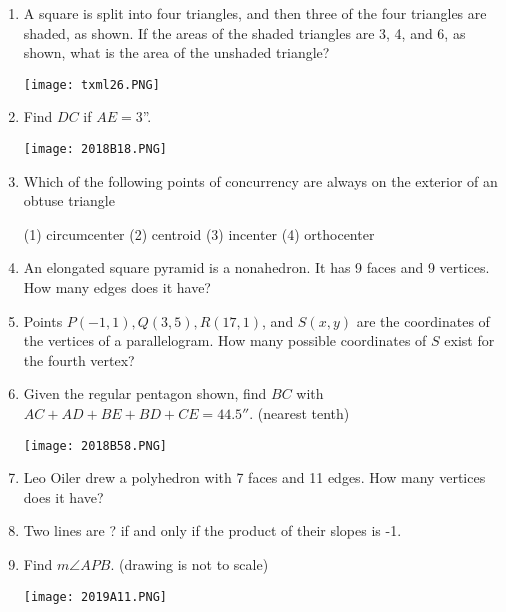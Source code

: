 \documentclass[../uilmath.tex]{subfiles}
\begin{document}
\begin{enumerate}[label=\bfseries\arabic*.]
    \item %
    A square is split into four triangles, and then three of the four triangles are shaded, as shown. If the areas of the shaded triangles are 3, 4, and 6, as shown, what is the area of the unshaded triangle?
    \begin{center}
        \texttt{[image: txml26.PNG]}
    \end{center}

    \item %
    Find $DC$ if $AE=3$''.
    \begin{center}
        \texttt{[image: 2018B18.PNG]}
    \end{center}

    \item %
    Which of the following points of concurrency are always on the exterior of an obtuse triangle
    
    (1) circumcenter \qquad (2) centroid \qquad (3) incenter \qquad (4) orthocenter

    \item %
    An elongated square pyramid is a nonahedron. It has 9 faces and 9 vertices. How many edges does it have?

    \item %
    Points $P(-1,1), Q(3,5), R(17,1)$, and $S(x,y)$ are the coordinates of the vertices of a parallelogram. How many possible coordinates of $S$ exist for the fourth vertex?

    \item %
    Given the regular pentagon shown, find $BC$ with $AC+AD+BE+BD+CE=44.5''$. (nearest tenth)
    \begin{center}
        \texttt{[image: 2018B58.PNG]}
    \end{center}

    \item %
    Leo Oiler drew a polyhedron with 7 faces and 11 edges. How many vertices does it have?

    \item %
    Two lines are \blank ? \blank if and only if the product of their slopes is -1.

    \item %
    Find $m\angle APB$. (drawing is not to scale)
    \begin{center}
        \texttt{[image: 2019A11.PNG]}
    \end{center}


\end{enumerate}
\end{document}
